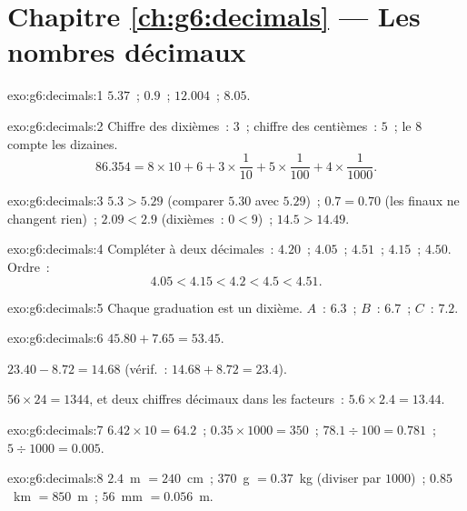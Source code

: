 \section*{Chapitre \ref{ch:g6:decimals} --- Les nombres décimaux}

\begin{solution}{exo:g6:decimals:1}
$5.37$~; \quad $0.9$~; \quad $12.004$~; \quad $8.05$.
\end{solution}

\begin{solution}{exo:g6:decimals:2}
Chiffre des dixièmes~: $3$~; chiffre des centièmes~: $5$~; le $8$
compte les dizaines.
\[
86.354 = 8 \times 10 + 6 + 3 \times \frac{1}{10} + 5 \times
\frac{1}{100} + 4 \times \frac{1}{1000}.
\]
\end{solution}

\begin{solution}{exo:g6:decimals:3}
$5.3 > 5.29$ (comparer $5.30$ avec $5.29$)~; \quad
$0.7 = 0.70$ (les  finaux ne changent rien)~; \quad
$2.09 < 2.9$ (dixièmes~: $0 < 9$)~; \quad
$14.5 > 14.49$.
\end{solution}

\begin{solution}{exo:g6:decimals:4}
Compléter à deux décimales~: $4.20$~; $4.05$~; $4.51$~; $4.15$~;
$4.50$. Ordre~:
\[
4.05 < 4.15 < 4.2 < 4.5 < 4.51 .
\]
\end{solution}

\begin{solution}{exo:g6:decimals:5}
Chaque graduation est un dixième. $A$~: $6.3$~; \quad $B$~: $6.7$~;
\quad $C$~: $7.2$.
\end{solution}

\begin{solution}{exo:g6:decimals:6}
$45.80 + 7.65 = 53.45$.

$23.40 - 8.72 = 14.68$ (vérif.~: $14.68 + 8.72 = 23.4$).

$56 \times 24 = 1344$, et deux chiffres décimaux dans les facteurs~:
$5.6 \times 2.4 = 13.44$.
\end{solution}

\begin{solution}{exo:g6:decimals:7}
$6.42 \times 10 = 64.2$~; \quad
$0.35 \times 1000 = 350$~; \quad
$78.1 \div 100 = 0.781$~; \quad
$5 \div 1000 = 0.005$.
\end{solution}

\begin{solution}{exo:g6:decimals:8}
$2.4$~m $= 240$~cm~; \quad $370$~g $= 0.37$~kg (diviser par $1000$)~;
\quad $0.85$~km $= 850$~m~; \quad $56$~mm $= 0.056$~m.
\end{solution}

